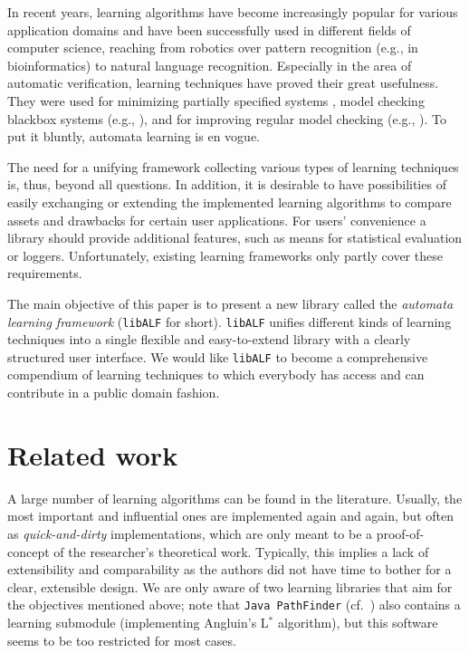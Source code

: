 \documentclass[a4paper, fontsize=11pt, DIV=12, parskip=half]{scrartcl}
\newcommand{\libalf}{\texttt{libALF}\xspace}
\newcommand{\lstar}{{\textsf{L}}$^\ast$\xspace}
\begin{document}
\enlargethispage*{\baselineskip}
In recent years, learning algorithms have become increasingly popular for
various application domains and have been successfully used in different
fields of computer science, reaching from robotics over pattern recognition (e.g., in bioinformatics) to natural language recognition. Especially in the area of automatic verification, learning techniques have proved their great usefulness. They were used for minimizing partially specified systems \cite{OliveiraS01}, model checking blackbox systems (e.g., \cite{GrocePY02}), and for improving regular model checking (e.g., \cite{HabermehlV05}). To put it bluntly, automata learning is en vogue.

The need for a unifying framework collecting various types of learning techniques is, thus, beyond all questions. In addition, it is desirable to have possibilities of easily exchanging or extending the implemented learning algorithms to compare assets and drawbacks for certain user applications. For users' convenience a library should provide additional features, such as means for statistical evaluation or loggers. Unfortunately, existing learning frameworks only partly cover these requirements.

The main objective of this paper is to present a new library called the \emph{automata learning framework} (\libalf for short). \libalf unifies different kinds of learning techniques into a single flexible and easy-to-extend library with a clearly structured user interface. We would like \libalf to become a comprehensive compendium of learning techniques to which everybody has access and can contribute in a public domain fashion.

\section{Related work}

A large number of learning algorithms can be found in the literature. Usually, the most important and influential ones are implemented again and again, but often as \emph{quick-and-dirty} implementations, which are only meant to be a proof-of-concept of the researcher's theoretical work. Typically, this implies a lack of extensibility and comparability as the authors did not have time to bother for a clear, extensible design. We are only aware of two learning libraries that aim for the objectives mentioned above; note that \texttt{Java PathFinder} (cf.\ \cite{DBLP:conf/fase/GiannakopoulouP09}) also contains a learning submodule (implementing Angluin's \lstar algorithm), but this software seems to be too restricted for most cases.
\end{document}
